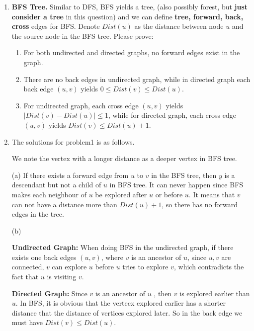 \documentclass[12pt,a4paper]{article}
\makeatletter
\newtheorem*{solution}{Solution}
\theoremstyle{definition}
\renewenvironment{solution}[1][Solution] {\par\pushQED{\qed}\normalfont\topsep6\p@\@plus6\p@\relax\trivlist\item[\hskip\labelsep\bfseries#1\@addpunct{.}]\ignorespaces}{\popQED\endtrivlist\@endpefalse} \makeatother
\makeatother
\begin{document}
\begin{enumerate}
    \item
    \textbf{BFS Tree.} Similar to DFS, BFS yields a tree, (also possibly forest, but \textbf{just consider a tree} in this question) and we can define \textbf{tree, forward, back, cross} edges for BFS. Denote $Dist(u)$ as the distance between node $u$ and the source node in the BFS tree. Please prove:
    \begin{enumerate}
    	\item For both undirected and directed graphs, no forward edges exist in the graph.
    	
    	\item There are no back edges in undirected graph, while in directed graph each back edge $(u,v)$ yields $0\leq Dist(v)\leq Dist(u)$.
    	
    	\item For undirected graph, each cross edge $(u,v)$ yields $|Dist(v)-Dist(u)|\le 1$, while for directed graph, each cross edge $(u,v)$ yields $Dist(v)\leq Dist(u)+1$.
    	
    \end{enumerate}

   \begin{solution}
	  The solutions for problem1 is as follows.

	  We note the vertex with a longer distance as a deeper vertex in BFS tree.
	  
	  

	  (a) If there exists a forward edge from $u$ to $v$ in the BFS tree, then $y$ is a descendant but not a child of $u$ in BFS tree. 
	  It can never happen since BFS makes each neighbour of $u$ be explored after $u$ or before $u$. It means that $v$ can not 
	  have a distance more than $Dist(u) + 1$, so there has no forward edges in the tree.  
	  
	  (b)

	  \textbf{Undirected Graph:} When doing BFS in the undirected graph, if there exists one back edges $(u, v)$, where $v$ is an ancestor of $u$,
	  since $u,v$ are connected, $v$ can explore $u$ before $u$ tries to explore $v$, which contradicts the fact that $u$ is visiting $v$.
	  
	  \textbf{Directed Graph:} Since $v$ is an ancestor of $u$ , then $v$ is explored earlier than $u$. In BFS, it is obvious that the vertecx explored
	  earlier has a shorter distance that the distance of vertices explored later. So in the back edge we must have $Dist(v) \leq Dist(u)$.


\end{solution}
\end{enumerate}
\end{document}

